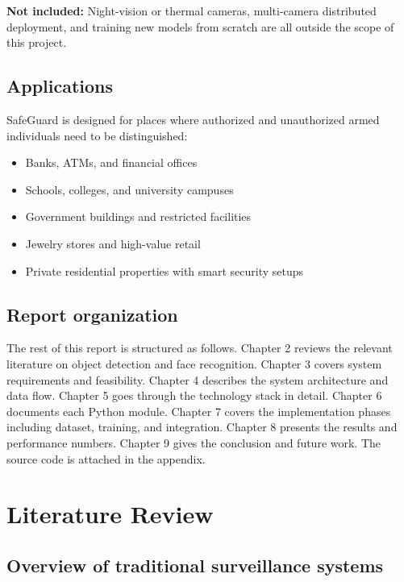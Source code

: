 \documentclass[12pt,a4paper]{report}
\begin{document}
\textbf{Not included:} Night-vision or thermal cameras, multi-camera distributed deployment, and training new models from scratch are all outside the scope of this project.

\section{Applications}

SafeGuard is designed for places where authorized and unauthorized armed individuals need to be distinguished:

\begin{itemize}
    \item Banks, ATMs, and financial offices
    \item Schools, colleges, and university campuses
    \item Government buildings and restricted facilities
    \item Jewelry stores and high-value retail
    \item Private residential properties with smart security setups
\end{itemize}

\section{Report organization}

The rest of this report is structured as follows. Chapter 2 reviews the relevant literature on object detection and face recognition. Chapter 3 covers system requirements and feasibility. Chapter 4 describes the system architecture and data flow. Chapter 5 goes through the technology stack in detail. Chapter 6 documents each Python module. Chapter 7 covers the implementation phases including dataset, training, and integration. Chapter 8 presents the results and performance numbers. Chapter 9 gives the conclusion and future work. The source code is attached in the appendix.


\chapter{Literature Review}

\section{Overview of traditional surveillance systems}
\end{document}
